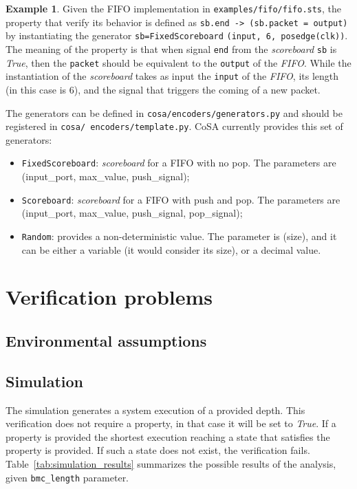 \documentclass{article}
\theoremstyle{definition}
\newtheorem{example}{Example}[section]
\begin{document}
\begin{example}
  Given the FIFO implementation in \texttt{examples/fifo/fifo.sts},
  the property that verify its behavior is defined as \texttt{sb.end
    -> (sb.packet = output)} by instantiating the generator
  \texttt{sb=FixedScoreboard} \texttt{(input, 6, posedge(clk))}. The meaning of
  the property is that when signal \texttt{end} from the
  \emph{scoreboard} \texttt{sb} is \emph{True}, then the
  \texttt{packet} should be equivalent to the \texttt{output} of the
  \emph{FIFO}. While the instantiation of the \emph{scoreboard} takes
  as input the \texttt{input} of the \emph{FIFO}, its length (in this
  case is 6), and the signal that triggers the coming of a new packet.
\end{example}

The generators can be defined in \texttt{cosa/encoders/generators.py}
and should be registered in \texttt{cosa/
  encoders/template.py}. CoSA
currently provides this set of generators:

\begin{itemize}
\item \texttt{FixedScoreboard}: \emph{scoreboard} for a FIFO with no
  pop. The parameters are (input\_port, max\_value, push\_signal);
\item \texttt{Scoreboard}: \emph{scoreboard} for a FIFO with push and
  pop. The parameters are (input\_port, max\_value, push\_signal,
  pop\_signal);
\item \texttt{Random}: provides a non-deterministic value. The
  parameter is (size), and it can be either a variable (it would
  consider its size), or a decimal value.
\end{itemize}  

\section{Verification problems}
\label{sec:problem_definition}


\subsection{Environmental assumptions}

\subsection{Simulation}
The simulation generates a system execution of a provided depth. This
verification does not require a property, in that case it will be set
to \emph{True}. If a property is provided the shortest execution
reaching a state that satisfies the property is provided. If such a
state does not exist, the verification
fails. Table~\ref{tab:simulation_results} summarizes the possible
results of the analysis, given \texttt{bmc\_length} parameter.
\end{document}
